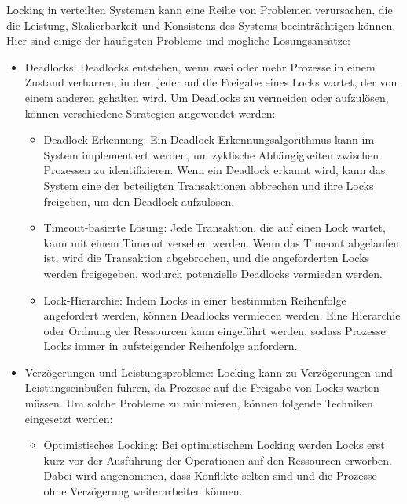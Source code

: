 Locking in verteilten Systemen kann eine Reihe von Problemen verursachen, die die Leistung, Skalierbarkeit und Konsistenz des Systems beeinträchtigen können. Hier sind einige der häufigsten Probleme und mögliche Lösungsansätze:
\begin{itemize}
\item Deadlocks: Deadlocks entstehen, wenn zwei oder mehr Prozesse in einem Zustand verharren, in dem jeder auf die Freigabe eines Locks wartet, der von einem anderen gehalten wird. Um Deadlocks zu vermeiden oder aufzulösen, können verschiedene Strategien angewendet werden:
\begin{itemize}
\item Deadlock-Erkennung: Ein Deadlock-Erkennungsalgorithmus kann im System implementiert werden, um zyklische Abhängigkeiten zwischen Prozessen zu identifizieren. Wenn ein Deadlock erkannt wird, kann das System eine der beteiligten Transaktionen abbrechen und ihre Locks freigeben, um den Deadlock aufzulösen.

\item Timeout-basierte Lösung: Jede Transaktion, die auf einen Lock wartet, kann mit einem Timeout versehen werden. Wenn das Timeout abgelaufen ist, wird die Transaktion abgebrochen, und die angeforderten Locks werden freigegeben, wodurch potenzielle Deadlocks vermieden werden.

\item Lock-Hierarchie: Indem Locks in einer bestimmten Reihenfolge angefordert werden, können Deadlocks vermieden werden. Eine Hierarchie oder Ordnung der Ressourcen kann eingeführt werden, sodass Prozesse Locks immer in aufsteigender Reihenfolge anfordern.
\end{itemize}
\item Verzögerungen und Leistungsprobleme: Locking kann zu Verzögerungen und Leistungseinbußen führen, da Prozesse auf die Freigabe von Locks warten müssen. Um solche Probleme zu minimieren, können folgende Techniken eingesetzt werden:
\begin{itemize}
\item Optimistisches Locking: Bei optimistischem Locking werden Locks erst kurz vor der Ausführung der Operationen auf den Ressourcen erworben. Dabei wird angenommen, dass Konflikte selten sind und die Prozesse ohne Verzögerung weiterarbeiten können.


\end{itemize}
\end{itemize}
